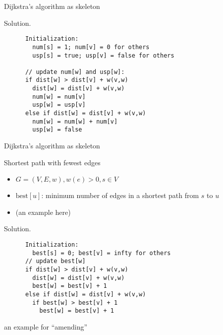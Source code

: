 \begin{frame}[fragile]{Dijkstra's algorithm as skeleton}
  \begin{block}{Solution.}
    \begin{verbatim}
      Initialization: 
        num[s] = 1; num[v] = 0 for others
        usp[s] = true; usp[v] = false for others

      // update num[w] and usp[w]:
      if dist[w] > dist[v] + w(v,w)
        dist[w] = dist[v] + w(v,w)
        num[w] = num[v]
        usp[w] = usp[v]
      else if dist[w] = dist[v] + w(v,w)
        num[w] = num[w] + num[v]
        usp[w] = false
    \end{verbatim}
  \end{block}
\end{frame}
\begin{frame}[fragile]{Dijkstra's algorithm as skeleton}
  \begin{exampleblock}{Shortest path with fewest edges }
    \begin{itemize}
      \item $G = (V, E, w), w(e) > 0, s \in V$
      \item $\text{best}[u]$: minimum number of edges in a shortest path from $s$ to $u$
      \item (an example here)
    \end{itemize}
  \end{exampleblock}

  \begin{block}{Solution.}
    \begin{verbatim}
      Initialization:
        best[s] = 0; best[v] = infty for others
      // update best[w]
      if dist[w] > dist[v] + w(v,w)
        dist[w] = dist[v] + w(v,w)
        best[w] = best[v] + 1
      else if dist[w] = dist[v] + w(v,w)
        if best[w] > best[v] + 1
          best[w] = best[v] + 1
    \end{verbatim}
    an example for ``amending''
  \end{block}
\end{frame}
